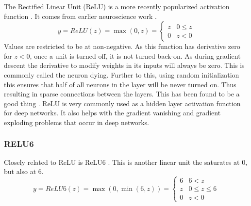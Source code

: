 \documentclass[12pt,parskip]{komatufte}\right
\begin{document}
The Rectified Linear Unit (ReLU) is a more recently popularized activation function .
It comes from earlier neuroscience work .
\begin{equation}
y=ReLU(z)=\max \left( 0, z \right)=\begin{cases}
z & 0\le z\\
0 & z<0
\end{cases}
\end{equation}
Values are restricted to be at non-negative.
As this function has derivative zero for $z<0$, once a unit is turned off, it is not turned back-on.
As during gradient descent the derivative to modify weights in its inputs will always be zero.
This is commonly called the neuron dying.
Further to this, using random initialization this ensures that half of all neurons in the layer will be never turned on.
Thus resulting in sparse connections between the layers.
This has been found to be a good thing .
ReLU is very commonly used as a hidden layer activation function for deep networks.
It also helps with the gradient vanishing and gradient exploding problems that occur in deep networks.


\subsubsection{RELU6}


Closely related to ReLU is ReLU6 .
This is another linear unit the saturates at 0, but also at 6.
\begin{equation}
y=ReLU6(z)=\max \left(0, \min\left(6, z\right) \right) =  \begin{cases}
6 & 6<z\\
z & 0\le z\le6\\
0 & z<0
\end{cases}
\end{equation}
\end{document}
